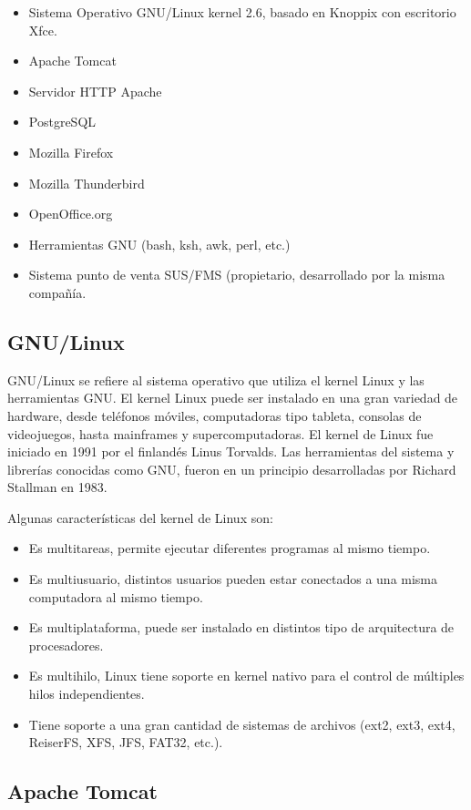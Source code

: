 \begin{itemize}
 \item Sistema Operativo GNU/Linux kernel 2.6, basado en Knoppix con escritorio Xfce.
 \item Apache Tomcat
 \item Servidor HTTP Apache
 \item PostgreSQL
 \item Mozilla Firefox
 \item Mozilla Thunderbird
 \item OpenOffice.org
 \item Herramientas GNU (bash, ksh, awk, perl, etc.)
 \item Sistema punto de venta SUS/FMS (propietario, desarrollado por la misma compañía.
\end{itemize}

\subsection{GNU/Linux}
\label{sec:linux}

GNU/Linux se refiere al sistema operativo que utiliza el kernel Linux y las herramientas GNU. El kernel Linux puede ser instalado en una gran variedad de hardware, desde teléfonos móviles, computadoras tipo tableta, consolas de videojuegos, hasta mainframes y supercomputadoras. El kernel de Linux fue iniciado en 1991 por el finlandés Linus Torvalds. Las herramientas del sistema y librerías conocidas como GNU, fueron en un principio desarrolladas por Richard Stallman en 1983.

Algunas características del kernel de Linux son:

\begin{itemize}
 \item Es multitareas, permite ejecutar diferentes programas al mismo tiempo.
 \item Es multiusuario, distintos usuarios pueden estar conectados a una misma computadora al mismo tiempo.
 \item Es multiplataforma, puede ser instalado en distintos tipo de arquitectura de procesadores.
 \item Es multihilo, Linux tiene soporte en kernel nativo para el control de múltiples hilos independientes.
 \item Tiene soporte a una gran cantidad de sistemas de archivos (ext2, ext3, ext4, ReiserFS, XFS, JFS, FAT32, etc.).
\end{itemize}


\subsection{Apache Tomcat}
\label{sec:tomcat}

